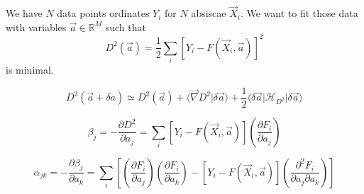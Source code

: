 \documentclass[aps,12pt]{revtex4}
\begin{document}
We have $N$ data points ordinates $Y_i$ for $N$ absiscae $\vec X_i$.
We want to fit those data with variables $\vec a \in \mathbb R^M$
such that
\begin{equation}
	D^2(\vec a) = \dfrac{1}{2} \sum_i \left[ Y_i - F(\vec X_i,\vec a) \right]^2 
\end{equation}
is minimal.

\begin{equation}
	D^2(\vec a + \delta a) \simeq D^2(\vec a) + \langle \vec \nabla D^2 \vert \delta \vec a \rangle
	 + \dfrac{1}{2} \langle \delta \vec a \vert \mathcal H_{D^2} \vert \delta \vec a\rangle
\end{equation}
	
\begin{equation}
	\beta_j = - \dfrac{\partial D^2}{\partial a_j} = \sum_i \left[ Y_i - F(\vec X_i,\vec a) \right] \left( \dfrac{\partial F_i}{\partial a_j} \right)
\end{equation}

\begin{equation}
	\alpha_{jk} = - \dfrac{\partial \beta_j}{\partial a_k} = 
	\sum_i \left[ \left( \dfrac{\partial F_i}{\partial a_j} \right) \left( \dfrac{\partial F_i}{\partial a_k} \right) - \left[ Y_i - F(\vec X_i,\vec a) \right] \left( \dfrac{\partial^2 F_i}{\partial a_j\partial a_k} \right) \right]
\end{equation}
\end{document}
